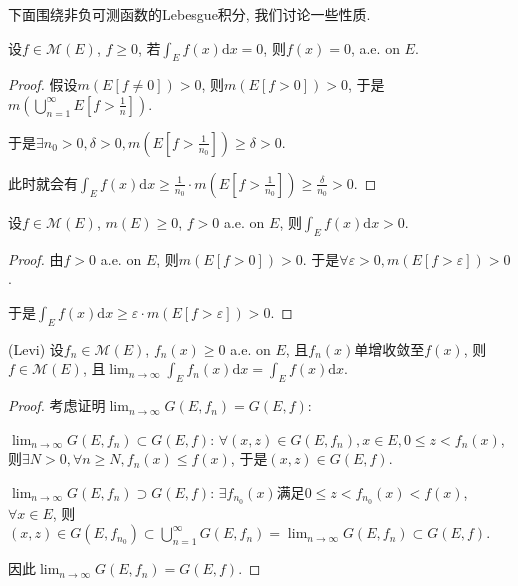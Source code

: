 \documentclass[theorem=false,mathfont=none,openany,sub3section]{easybook}
\begin{document}
下面围绕非负可测函数的Lebesgue积分, 我们讨论一些性质.\par

\begin{corollary}
  设$f\in \mathcal{M} (E)$, $f\geqslant 0$, 若$\int_{E}f(x)\mathrm{d}x=0$, 则$f(x)=0$, a.e. on $E$.\par
\end{corollary}

\begin{proof}
  假设$m(E[f\ne 0])>0$, 则$m(E[f> 0])>0$, 于是$m(\bigcup_{n=1}^{\infty}E[f>\frac{1}{n}])$.\par
  于是$\exists n_0>0, \delta>0, m(E[f>\frac{1}{n_0}])\geqslant \delta>0$.\par
  此时就会有$\int_{E}f(x)\mathrm{d}x\geqslant \frac{1}{n_0}\cdot m(E[f>\frac{1}{n_0}])\geqslant \frac{\delta}{n_0}>0$.\par 
\end{proof}

\begin{corollary}
  设$f\in \mathcal{M} (E)$, $m(E)\geqslant 0$, $f>0$ a.e. on $E$, 则$\int_{E}f(x)\mathrm{d}x>0$.\par
\end{corollary}

\begin{proof}
  由$f>0$ a.e. on $E$, 则$m(E[f>0])>0$. 于是$\forall \varepsilon >0, m(E[f>\varepsilon])>0$.\par
  于是$\int_{E}f(x)\mathrm{d}x\geqslant \varepsilon\cdot m(E[f>\varepsilon])>0$.\par
\end{proof}

\begin{theorem}
  (Levi) 设${f_n}\in \mathcal{M}(E)$, $f_n(x)\geqslant 0$ a.e. on $E$, 且$f_n(x)$单增收敛至$f(x)$, 则$f\in \mathcal{M}(E)$, 且$\lim_{n \to \infty}\int_{E}f_n(x)\mathrm{d}x= \int_{E}f(x)\mathrm{d}x$.\par 
\end{theorem}

\begin{proof}
  考虑证明$\lim_{n \to \infty}G(E,f_n) = G(E,f)$:\par
  $\lim_{n \to \infty}G(E,f_n) \subset G(E,f)$: $\forall (x,z)\in G(E,f_n), x\in E, 0\leqslant z<f_n(x)$, 则$\exists N>0, \forall n\geqslant N, f_n(x)\leqslant f(x)$, 于是$(x,z)\in G(E,f)$.\par
  $\lim_{n \to \infty}G(E,f_n) \supset G(E,f)$: $\exists f_{n_0}(x)$满足$0\leqslant z<f_{n_0}(x)<f(x)$, $\forall x\in E$, 则$(x,z)\in G(E,f_{n_0})\subset \bigcup_{n=1}^{\infty}G(E,f_n)=\lim_{n \to \infty}G(E,f_n)\subset G(E,f)$.\par
  因此$\lim_{n \to \infty}G(E,f_n) = G(E,f)$.\par
\end{proof}
\end{document}
